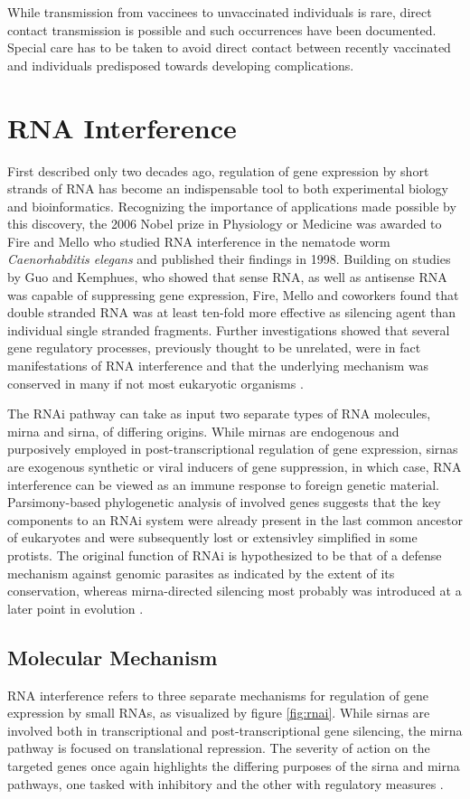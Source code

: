 While transmission from vaccinees to unvaccinated individuals is rare, direct contact transmission is possible and such occurrences have been documented. Special care has to be taken to avoid direct contact between recently vaccinated and individuals predisposed towards developing complications.

\section{RNA Interference}
First described only two decades ago, regulation of gene expression by short strands of RNA has become an indispensable tool to both experimental biology and bioinformatics. Recognizing the importance of applications made possible by this discovery, the 2006 Nobel prize in Physiology or Medicine was awarded to Fire and Mello who studied RNA interference in the nematode worm \textit{Caenorhabditis elegans} and published their findings in 1998. Building on studies by Guo and Kemphues, who showed that sense RNA, as well as antisense RNA was capable of suppressing gene expression, Fire, Mello and coworkers found that double stranded RNA was at least ten-fold more effective as silencing agent than individual single stranded fragments. Further investigations showed that several gene regulatory processes, previously thought to be unrelated, were in fact manifestations of RNA interference and that the underlying mechanism was conserved in many if not most eukaryotic organisms \citep{Hannon2002}.

The RNAi pathway can take as input two separate types of RNA molecules, \gls{mirna} and \gls{sirna}, of differing origins. While \glspl{mirna} are endogenous and purposively employed in post-transcriptional regulation of gene expression, \glspl{sirna} are exogenous synthetic or viral inducers of gene suppression, in which case, RNA interference can be viewed as an immune response to foreign genetic material. Parsimony-based phylogenetic analysis of involved genes suggests that the key components to an RNAi system were already present in the last common ancestor of eukaryotes and were subsequently lost or extensivley simplified in some protists. The original function of RNAi is hypothesized to be that of a defense mechanism against genomic parasites as indicated by the extent of its conservation, whereas \gls{mirna}-directed silencing most probably was introduced at a later point in evolution \citep{Cerutti2006}.

\subsection{Molecular Mechanism}
RNA interference refers to three separate mechanisms for regulation of gene expression by small RNAs, as visualized by figure \ref{fig:rnai}. While \glspl{sirna} are involved both in transcriptional and post-transcriptional gene silencing, the \gls{mirna} pathway is focused on translational repression. The severity of action on the targeted genes once again highlights the differing purposes of the \gls{sirna} and \gls{mirna} pathways, one tasked with inhibitory and the other with regulatory measures \citep{Wilson2013,Kim2007,Carthew2009}.

